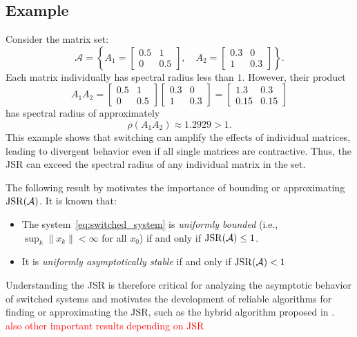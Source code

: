 \subsection*{Example}

Consider the matrix set:
\[
\mathcal{A} = \left\{ A_1 = 
\begin{bmatrix}
0.5 & 1 \\
0 & 0.5
\end{bmatrix}, \quad
A_2 =
\begin{bmatrix}
0.3 & 0 \\
1 & 0.3
\end{bmatrix}
\right\}.
\]
Each matrix individually has spectral radius less than $1$. However, their product
\[
A_1 A_2 =
\begin{bmatrix}
0.5 & 1 \\
0 & 0.5
\end{bmatrix}
\begin{bmatrix}
0.3 & 0 \\
1 & 0.3
\end{bmatrix}
=
\begin{bmatrix}
1.3 & 0.3 \\
0.15 & 0.15
\end{bmatrix}
\]
has spectral radius of approximately
\[
\rho(A_1 A_2) \approx 1.2929 > 1.
\]
This example shows that switching can amplify the effects of individual matrices, leading to divergent behavior even if all single matrices are contractive. Thus, the JSR can exceed the spectral radius of any individual matrix in the set.

The following result by \citep{blondelSurveyComputationalComplexity2000} motivates the importance of bounding or approximating $\operatorname{JSR}(\mathcal{A})$. It is known that:
\begin{samepage}
    \begin{itemize}
        \item The system~\eqref{eq:switched_system} is \emph{uniformly bounded} (i.e., $\sup_k \|x_k\| < \infty$ for all $x_0$) if and only if $\operatorname{JSR}(\mathcal{A}) \leq 1$.
        \item It is \emph{uniformly asymptotically stable} if and only if $\operatorname{JSR}(\mathcal{A}) < 1$ 
    \end{itemize}
\end{samepage}

Understanding the JSR is therefore critical for analyzing the asymptotic behavior of switched systems and motivates the development of reliable algorithms for finding or approximating the JSR, such as the hybrid algorithm proposed in \citep{mejstrikHybridApproachJoint2024}.
\textcolor{red}{also other important results depending on JSR}

